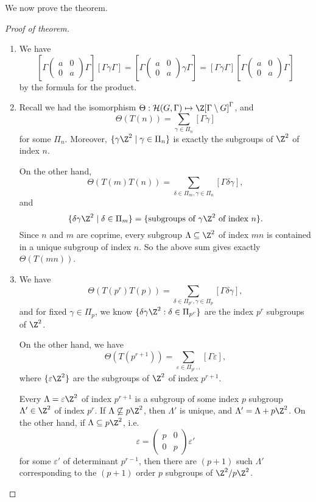 \documentclass[a4paper]{article}
\begin{document}
We now prove the theorem.
\begin{proof}[Proof of theorem]\leavevmode
  \begin{enumerate}
    \item We have
      \[
        \left[\Gamma
          \begin{pmatrix}
            a & 0\\
            0 & a
        \end{pmatrix}\Gamma\right][\Gamma\gamma\Gamma] =
        \left[\Gamma
          \begin{pmatrix}
            a & 0\\
            0 & a
        \end{pmatrix}\gamma \Gamma\right]
         = [\Gamma \gamma \Gamma] \left[\Gamma
          \begin{pmatrix}
            a & 0\\
            0 & a
        \end{pmatrix}\Gamma\right]
      \]
      by the formula for the product.
    \item Recall we had the isomorphism $\Theta: \mathcal{H}(G, \Gamma) \mapsto \Z[\Gamma \setminus G]^\Gamma$, and
      \[
        \Theta(T(n)) = \sum_{\gamma \in \Pi_n} [\Gamma\gamma]
      \]
      for some $\Pi_n$. Moreover, $\{\gamma \Z^2 \mid \gamma \in \Pi_n\}$ is exactly the subgroups of $\Z^2$ of index $n$.

      On the other hand,
      \[
        \Theta(T(m)T(n)) = \sum_{\delta \in \Pi_m, \gamma \in \Pi_n} [\Gamma \delta\gamma],
      \]
      and
      \[
        \{\delta\gamma \Z^2 \mid \delta \in \Pi_m\} = \{\text{subgroups of $\gamma \Z^2$ of index $n$}\}.
      \]
      Since $n$ and $m$ are coprime, every subgroup $\Lambda \subseteq \Z^2$ of index $mn$ is contained in a unique subgroup of index $n$. So the above sum gives exactly $\Theta(T(mn))$.
    \item We have
      \[
        \Theta(T(p^r) T(p)) = \sum_{\delta \in \Pi_{p^r}, \gamma \in \Pi_p} [\Gamma \delta \gamma],
      \]
      and for fixed $\gamma \in \Pi_p$, we know $\{\delta \gamma \Z^2: \delta \in \Pi_{p^r}\}$ are the index $p^r$ subgroups of $\Z^2$.

      On the other hand, we have
      \[
        \Theta(T(p^{r + 1})) = \sum_{\varepsilon \in \Pi_{p^{r + 1}}} [\Gamma \varepsilon],
      \]
      where $\{\varepsilon \Z^2\}$ are the subgroups of $\Z^2$ of index $p^{r + 1}$.

      Every $\Lambda = \varepsilon \Z^2$ of index $p^{r + 1}$ is a subgroup of some index $p$ subgroup $\Lambda' \in \Z^2$ of index $p^r$. If $\Lambda \not \subseteq p\Z^2$, then $\Lambda'$ is unique, and $\Lambda' = \Lambda + p \Z^2$. On the other hand, if $\Lambda \subseteq p\Z^2$, i.e.\ %
      \[
        \varepsilon =
        \begin{pmatrix}
          p & 0\\
          0 & p
        \end{pmatrix} \varepsilon'
      \]
      for some $\varepsilon'$ of determinant $p^{r - 1}$, then there are $(p + 1)$ such $\Lambda'$ corresponding to the $(p + 1)$ order $p$ subgroups of $\Z^2/p\Z^2$.


\end{enumerate}
\end{proof}
\end{document}
